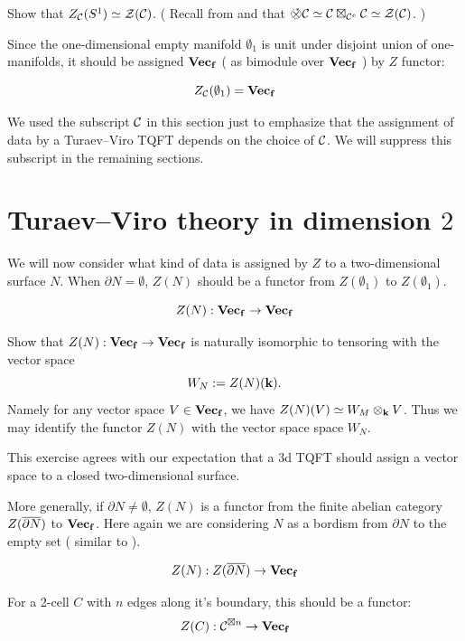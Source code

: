 \begin{exercise}
	Show that $Z_{\mathcal{C}} ( S^1 ) \simeq \mathcal{Z}(\mathcal{C})$. ( Recall from  and  
	that $ \circtensor \calC \simeq  \calC\boxtimes_{\calC^e} \calC \simeq  \calZ(\calC) $. )
\end{exercise}

Since the one-dimensional empty manifold $\emptyset_1$ is unit under disjoint union of one-manifolds, it should 
be assigned $\mathbf{Vec_f}$ ( as bimodule over $\mathbf{Vec_f}$ ) by $Z$ functor:

\[
Z_{\mathcal{C}}(\emptyset_1)=\mathbf{Vec_f}
\]

We used the subscript $\mathcal{C}$ in this section just to emphasize that the assignment of data by a Turaev--Viro TQFT 
depends on the choice of $\mathcal{C}$. We will suppress this subscript in the remaining sections.
\section{Turaev--Viro theory in dimension $2$}\label{s:tv-dim2}

We will now consider what kind of data is assigned by $Z$ to a two-dimensional surface $N$. When
 $\partial N = \emptyset$, $Z(N)$ should be a functor from $Z(\emptyset_1)$ to $Z(\emptyset_1)$.

\[ 
Z(N): \mathbf{Vec_f} \rightarrow \mathbf{Vec_f}
\]

\begin{exercise}
	Show that $Z(N): \mathbf{Vec_f} \rightarrow \mathbf{Vec_f}$ is naturally isomorphic to tensoring with the vector space 
	$$ W_N := Z(N)(\mathbf{k}).$$ Namely for any vector space $V \in \mathbf{Vec_f}$, we have $Z(N)(V) \simeq W_M \otimes_{\mathbf{k}} V$. 
	Thus we may identify the functor $Z(N)$ with the vector space space $W_N$.
\end{exercise}

This exercise agrees with our expectation that a 3d TQFT should assign a vector space to a closed two-dimensional surface.


More generally, if $\partial N \ne \emptyset$, $Z(N)$ is a functor from the finite abelian category $Z(\overline{\partial  N})$ 
to $\mathbf{Vec_f}$. Here again we are considering $N$ as a bordism from $\partial N$ to the empty set ( similar to  ).

\[
Z(N): Z(\overline{\partial  N}) \rightarrow \mathbf{Vec_f}
\]


For a 2-cell $C$ with $n$ edges along it's boundary, this should be a functor:
\[
Z(C):\mathcal{C}^{\boxtimes n}\to \mathbf{Vec_f}
\]


